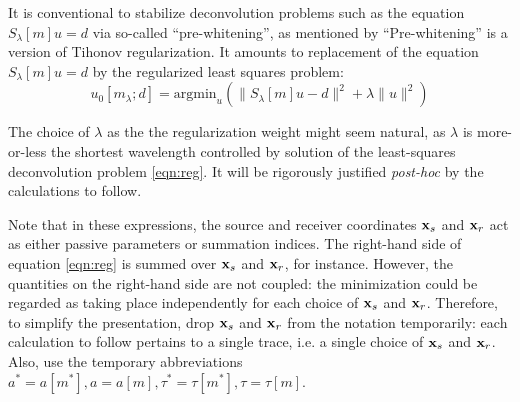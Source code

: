 It is conventional to stabilize deconvolution problems such as the
equation $S_{\lambda}[m]u=d$ via so-called ``pre-whitening'', as
mentioned by \cite{Warner:16} ``Pre-whitening'' is a version of
Tihonov regularization. It  amounts to replacement of the equation
$S_{\lambda}[m]u=d$ by the regularized least squares problem: 
\begin{equation}
  \label{eqn:reg}
  u_0[m_{\lambda};d] = \mbox{argmin}_u (\|S_{\lambda}[m]u-d\|^2 + \lambda\|u\|^2)
\end{equation}

The choice of $\lambda$ as the  the regularization weight might seem
natural, as $\lambda$ is more-or-less the shortest wavelength
controlled by solution of the least-squares deconvolution problem
\ref{eqn:reg}. It will be rigorously justified {\em post-hoc} by the
calculations to follow.

Note that in these expressions, the source and receiver coordinates
${\bf x}_s$ and ${\bf x}_r$ act as either passive parameters or
summation indices. The right-hand side of equation \ref{eqn:reg} is
summed over ${\bf x}_s$ and ${\bf x}_r$, for instance. However, the
quantities on the right-hand side are not coupled: the minimization
could be regarded as taking place independently for each choice of
${\bf x}_s$ and ${\bf x}_r$. Therefore, to simplify the presentation,
drop ${\bf x}_s$ and ${\bf x}_r$ from the notation temporarily: each
calculation to follow pertains to a single trace, i.e. a single choice
of ${\bf x}_s$ and ${\bf x}_r$.  Also, use the
temporary abbreviations
$a^*=a[m^*], a=a[m], \tau^*=\tau[m^*], \tau=\tau[m]$.

